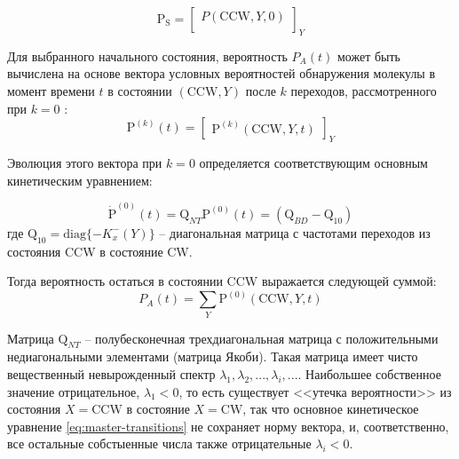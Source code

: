\begin{equation}
    \boldsymbol{\mathrm{P_S}} = 
    \begin{bmatrix} P(\mathrm{CCW}, Y, 0)\\ \end{bmatrix}_Y
    \label{eq:start-prob}
\end{equation}

Для выбранного начального состояния, вероятность $P_A(t)$ может быть вычислена на основе вектора условных вероятностей обнаружения молекулы в момент времени $t$ в состоянии $(\mathrm{CCW}, Y)$ после $k$ переходов, рассмотренного при $k=0$ \cite{}: 
\begin{equation}
    \boldsymbol{\mathrm{P}}^{(k)}(t) = \begin{bmatrix} \boldsymbol{\mathrm{P}}^{(k)}(\mathrm{CCW}, Y, t)\end{bmatrix}_Y
    \label{eq:conditioned-transitions}
\end{equation}

Эволюция этого вектора при $k=0$ определяется соответствующим основным кинетическим уравнением:

\begin{equation}
    \dot{\boldsymbol{\mathrm{P}}}^{(0)}(t)=\boldsymbol{\mathrm{Q}}_{NT}\mathrm{P}^{(0)}(t) = \left (\boldsymbol{\mathrm{Q}}_{BD} - \boldsymbol{\mathrm{Q}}_{10} \right )
    \label{eq:conditioned-master-transtions}
\end{equation}
где $\boldsymbol{\mathrm{Q}}_{10} = \mathrm{diag}\{-K^-_x(Y)\}$ -- диагональная матрица с частотами переходов из состояния CCW в состояние CW.

Тогда вероятность остаться в состоянии CCW выражается следующей суммой:
\begin{equation}
    P_A(t) = \sum_Y \mathrm{P}^{(0)}(\mathrm{CCW},Y,t)
    \label{eq:no-transition-prob}
\end{equation}

Матрица $\boldsymbol{\mathrm{Q}}_{NT}$ -- полубесконечная трехдиагональная матрица с положительными недиагональными элементами (матрица Якоби). Такая матрица имеет чисто вещественный невырожденный спектр ${\lambda_1, \lambda_2, ..., \lambda_i, ...}$. Наибольшее собственное значение отрицательное, $\lambda_1 < 0$, то есть существует <<утечка вероятности>> из состояния $X = \mathrm{CCW}$ в состояние $X = \mathrm{CW}$, так что основное кинетическое уравнение \cref{eq:master-transitions} не сохраняет норму вектора, и, соответственно, все остальные собстыенные числа также отрицательные $\lambda_i < 0$. 

